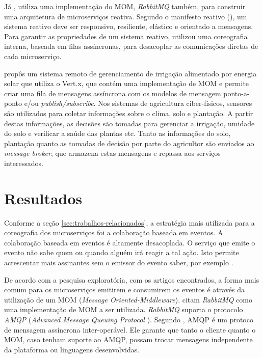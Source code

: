 \documentclass[12pt]{article}
\theoremstyle{plain}
\begin{document}
Já \cite{Brilhante:2017}, utiliza uma implementação do MOM, \textit{RabbitMQ} também, para construir uma arquitetura de microserviços reativa. Segundo o manifesto reativo (\cite{reactivemanifesto}), um sistema reativo deve ser responsivo, resiliente, elástico e orientado a mensagens. Para garantir as propriedades de um sistema reativo, \cite{Brilhante:2017} utilizou uma coreografia interna, baseada em filas assíncronas, para desacoplar as comunicações diretas de cada microserviço.  

\cite{Abdelouahed:2018} propôs um sistema remoto de gerenciamento de irrigação alimentado por energia solar que utiliza o Vert.x, que contém uma implementação de MOM e permite criar uma fila de mensagens assíncrona com os modelos de mensagem ponto-a-ponto e/ou \textit{publish/subscribe}. Nos sistemas de agricultura ciber-físicos, sensores são utilizados para coletar informações sobre o clima, solo e plantação. A partir destas informações, as decisões são tomadas para gerenciar a irrigação, umidade do solo e verificar a saúde das plantas etc. Tanto as informações do solo, plantação quanto as tomadas de decisão por parte do agricultor são enviados ao \textit{message broker}, que armazena estas mensagens e repassa aos serviços interessados. 

\section{Resultados}
\label{sec:resultados}

Conforme a seção \ref{sec:trabalhos-relacionados}, a estratégia mais utilizada para a coreografia dos microserviços foi a colaboração baseada em eventos. A colaboração baseada em eventos é altamente desacoplada. O serviço que emite o evento não sabe quem ou quando alguém irá reagir a tal ação. Isto permite acrescentar mais assinantes sem o emissor do evento saber, por exemplo \cite{Newman:15}.

De acordo com a pesquisa exploratória, com os artigos encontrados, a forma mais comum para os microserviços emitirem e consumirem os eventos é através da utilização de um MOM (\textit{Message Oriented-Middleware}). \cite{Newman:15, Brilhante:2017, richter:2017} citam \textit{RabbitMQ} como uma implementação de MOM a ser utilizada. \textit{RabbitMQ} suporta o protocolo \emph{AMQP} (\textit{Advanced Message Queuing Protocol }). Segundo \cite{Vinoski:06}, AMQP é um protoco de mensagem assíncrona inter-operável. Ele garante que tanto o cliente quanto o MOM, caso tenham suporte ao AMQP, possam trocar mensagens independente da plataforma ou linguagens desenvolvidas.
\end{document}
